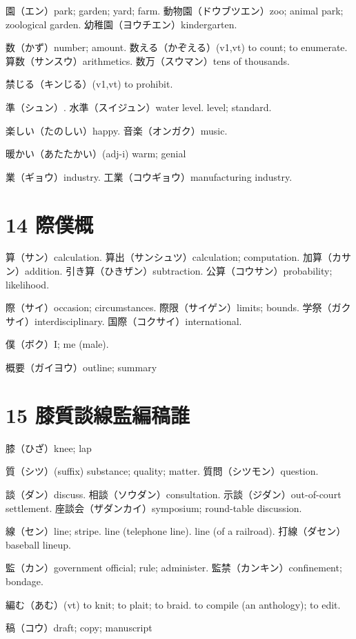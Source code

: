 園（エン）park; garden; yard; farm.
動物園（ドウブツエン）zoo; animal park; zoological garden.
幼稚園（ヨウチエン）kindergarten.

数（かず）number; amount.
数える（かぞえる）(v1,vt) to count; to enumerate.
算数（サンスウ）arithmetics.
数万（スウマン）tens of thousands.

禁じる（キンじる）(v1,vt) to prohibit.

準（シュン）.
水準（スイジュン）water level. level; standard.

楽しい（たのしい）happy.
音楽（オンガク）music.

暖かい（あたたかい）(adj-i) warm; genial

業（ギョウ）industry.
工業（コウギョウ）manufacturing industry.

\section{14 際僕概}

算（サン）calculation.
算出（サンシュツ）calculation; computation.
加算（カサン）addition.
引き算（ひきザン）subtraction.
公算（コウサン）probability; likelihood.

際（サイ）occasion; circumstances.
際限（サイゲン）limits; bounds.
学祭（ガクサイ）interdisciplinary.
国際（コクサイ）international.

僕（ボク）I; me (male).

概要（ガイヨウ）outline; summary

\section{15 膝質談線監編稿誰}

膝（ひざ）knee; lap

質（シツ）(suffix) substance; quality; matter.
質問（シツモン）question.

談（ダン）discuss.
相談（ソウダン）consultation.
示談（ジダン）out-of-court settlement.
座談会（ザダンカイ）symposium; round-table discussion.

線（セン）line; stripe.
line (telephone line).
line (of a railroad).
打線（ダセン）baseball lineup.

監（カン）government official; rule; administer.
監禁（カンキン）confinement; bondage.

編む（あむ）(vt)
to knit; to plait; to braid.
to compile (an anthology); to edit.

稿（コウ）draft; copy; manuscript


